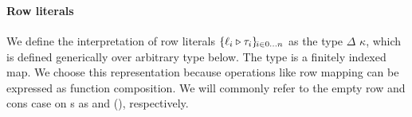 \documentclass[sigplan,screen]{acmart}
\begin{document}
\begin{AgdaAlign}
\begin{code}%
%
\>[4]\AgdaSpace{}%
\AgdaSpace{}%
\AgdaSymbol{(}\AgdaSpace{}%
\AgdaSpace{}%
\AgdaSymbol{)}\AgdaSpace{}%
\AgdaSymbol{=}\<%
\\
\>[4][@{}l@{\AgdaIndent{0}}]%
\>[8]\AgdaSpace{}%
\AgdaSpace{}%
\AgdaSymbol{(}\AgdaSpace{}%
\AgdaSpace{}%
\AgdaSymbol{)}\<%
\\
\>[4][@{}l@{\AgdaIndent{0}}]%
\>[5]\AgdaSpace{}%
\AgdaSpace{}%
\AgdaSpace{}%
\AgdaSpace{}%
\<%
\end{code}
\end{AgdaAlign}


\paragraph{Row literals} We define the interpretation of row literals ${\RowIx i 0 n {\LabTy {\ell_i} {\tau_i}}}$ as the type  \Symbol{(} $\Delta$ $\kappa$\Symbol{)}, which is defined generically over arbitrary type  \Symbol{:}  below. The  type is a finitely indexed map. We choose this representation because operations like row mapping can be expressed as function composition. We will commonly refer to the empty row and cons case on s as  and (), respectively.
\end{document}
